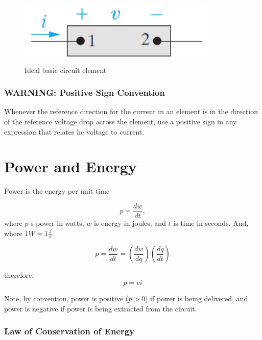\documentclass[14pt]{memoir}
\begin{document}
\begin{figure}[h]
\begin{center}
\includegraphics[scale=0.40]{fig/fig01_05.png}
\caption{Ideal basic circuit element}
\label{fig:f01_05}
\end{center}
\end{figure}


\subsubsection{WARNING: Positive Sign Convention}

Whenever the reference direction for the current in an element is in the direction of the reference voltage drop across the element, use a positive sign in any expression that relates he voltage to current. 

\section{Power and Energy}

Power is the energy per unit time

\begin{equation}
p = \frac{dw}{dt},
\end{equation}
where $p$ s power in watts, $w$ is energy in joules, and $t$ is time in seconds. And, where $1W = 1 \frac{J}{s}$.

\begin{equation}
p = \frac{dw}{dt} = (\frac{dw}{dq}) (\frac{dq}{dt})
\end{equation}

therefore,
\begin{equation}
p = v i
\end{equation}

Note, by convention, power is positive ($p>0$) if power is being delivered, and power is negative if power is being extracted from the circuit. 


\subsubsection{Law of Conservation of Energy}
\end{document}
